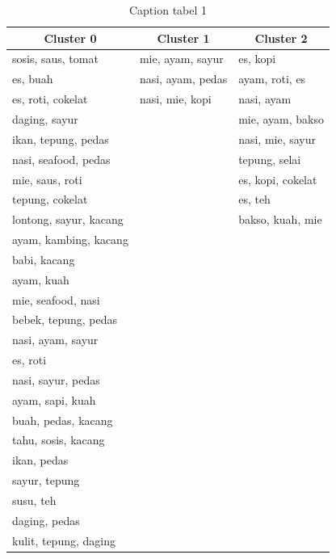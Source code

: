 \lipsum[5]
\begin{table}[h]
\begin{center} {\footnotesize

\begin{tabular}{lll}
\hline
 \multicolumn{1}{c}{Cluster 0} & \multicolumn{1}{c}{Cluster 1} & \multicolumn{1}{c}{Cluster 2}\\
\hline
    sosis, saus, tomat  &  mie, ayam, sayur  & es, kopi	\\[.2ex]
    es, buah  &  nasi, ayam, pedas  &  ayam, roti, es  \\[.2ex] 
    es, roti, cokelat &  nasi, mie, kopi  &   nasi, ayam \\[.2ex] 
    daging, sayur &    &  mie, ayam, bakso \\[.2ex] 
    ikan, tepung, pedas &    & nasi, mie, sayur	 \\[.2ex] 
    nasi, seafood, pedas &    & tepung, selai\\[.2ex] 
    mie, saus, roti &    & es, kopi, cokelat  \\[.2ex] 
    tepung, cokelat	 &    & es, teh \\[.2ex] 
    lontong, sayur, kacang &    & bakso, kuah, mie\\[.2ex] 
    ayam, kambing, kacang &    &    \\[.2ex] 
    babi, kacang &    &    \\[.2ex] 
    ayam, kuah &    &    \\[.2ex] 
    mie, seafood, nasi &    &    \\[.2ex] 
    bebek, tepung, pedas &    &    \\[.2ex] 
    nasi, ayam, sayur &    &    \\[.2ex] 
    es, roti &    &    \\[.2ex] 
    nasi, sayur, pedas &    &    \\[.2ex] 
    ayam, sapi, kuah &    &    \\[.2ex]
    buah, pedas, kacang &    &    \\[.2ex]
    tahu, sosis, kacang &    &    \\[.2ex]
    ikan, pedas &    &    \\[.2ex]
    sayur, tepung &    &    \\[.2ex]
    susu, teh &    &    \\[.2ex]
    daging, pedas &    &    \\[.2ex]
    kulit, tepung, daging &    &    \\[.2ex]
\hline
\end{tabular}
}
\end{center}
\caption{Caption tabel 1}
\label{turns}
\end{table}

\lipsum[6]